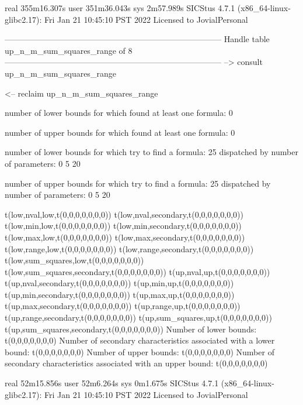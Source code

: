 real	355m16.307s
user	351m36.043s
sys	2m57.989s
SICStus 4.7.1 (x86_64-linux-glibc2.17): Fri Jan 21 10:45:10 PST 2022
Licensed to JovialPersonal


--------------------------------------------------------------------------------
Handle table up_n_m_sum_squares_range of 8
--------------------------------------------------------------------------------
--> consult up_n_m_sum_squares_range

<-- reclaim up_n_m_sum_squares_range

number of lower bounds for which found at least one formula: 0

number of upper bounds for which found at least one formula: 0

number of lower bounds for which try to find a formula: 25
dispatched by number of parameters: 0  5  20

number of upper bounds for which try to find a formula: 25
dispatched by number of parameters: 0  5  20

t(low,nval,low,t(0,0,0,0,0,0,0))
t(low,nval,secondary,t(0,0,0,0,0,0,0))
t(low,min,low,t(0,0,0,0,0,0,0))
t(low,min,secondary,t(0,0,0,0,0,0,0))
t(low,max,low,t(0,0,0,0,0,0,0))
t(low,max,secondary,t(0,0,0,0,0,0,0))
t(low,range,low,t(0,0,0,0,0,0,0))
t(low,range,secondary,t(0,0,0,0,0,0,0))
t(low,sum_squares,low,t(0,0,0,0,0,0,0))
t(low,sum_squares,secondary,t(0,0,0,0,0,0,0))
t(up,nval,up,t(0,0,0,0,0,0,0))
t(up,nval,secondary,t(0,0,0,0,0,0,0))
t(up,min,up,t(0,0,0,0,0,0,0))
t(up,min,secondary,t(0,0,0,0,0,0,0))
t(up,max,up,t(0,0,0,0,0,0,0))
t(up,max,secondary,t(0,0,0,0,0,0,0))
t(up,range,up,t(0,0,0,0,0,0,0))
t(up,range,secondary,t(0,0,0,0,0,0,0))
t(up,sum_squares,up,t(0,0,0,0,0,0,0))
t(up,sum_squares,secondary,t(0,0,0,0,0,0,0))
Number of lower bounds:                                             t(0,0,0,0,0,0,0)
Number of secondary characteristics associated with a lower bound:  t(0,0,0,0,0,0,0)
Number of upper bounds:                                             t(0,0,0,0,0,0,0)
Number of secondary characteristics associated with an upper bound: t(0,0,0,0,0,0,0)

real	52m15.856s
user	52m6.264s
sys	0m1.675s
SICStus 4.7.1 (x86_64-linux-glibc2.17): Fri Jan 21 10:45:10 PST 2022
Licensed to JovialPersonal


